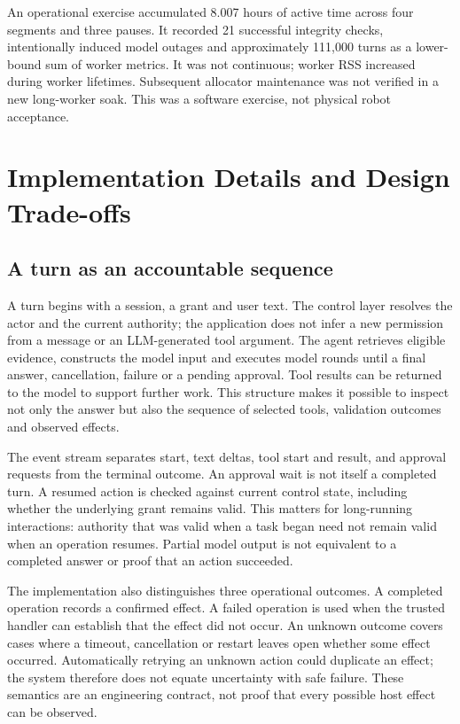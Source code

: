 \documentclass[11pt]{article}
\begin{document}
An operational exercise accumulated 8.007 hours of active time across four segments and three pauses. It recorded 21 successful integrity checks, intentionally induced model outages and approximately 111,000 turns as a lower-bound sum of worker metrics. It was not continuous; worker RSS increased during worker lifetimes. Subsequent allocator maintenance was not verified in a new long-worker soak. This was a software exercise, not physical robot acceptance.


\section{Implementation Details and Design Trade-offs}
\subsection{A turn as an accountable sequence}
A turn begins with a session, a grant and user text. The control layer resolves the actor and the current authority; the application does not infer a new permission from a message or an LLM-generated tool argument. The agent retrieves eligible evidence, constructs the model input and executes model rounds until a final answer, cancellation, failure or a pending approval. Tool results can be returned to the model to support further work. This structure makes it possible to inspect not only the answer but also the sequence of selected tools, validation outcomes and observed effects.

The event stream separates start, text deltas, tool start and result, and approval requests from the terminal outcome. An approval wait is not itself a completed turn. A resumed action is checked against current control state, including whether the underlying grant remains valid. This matters for long-running interactions: authority that was valid when a task began need not remain valid when an operation resumes. Partial model output is not equivalent to a completed answer or proof that an action succeeded.

The implementation also distinguishes three operational outcomes. A completed operation records a confirmed effect. A failed operation is used when the trusted handler can establish that the effect did not occur. An unknown outcome covers cases where a timeout, cancellation or restart leaves open whether some effect occurred. Automatically retrying an unknown action could duplicate an effect; the system therefore does not equate uncertainty with safe failure. These semantics are an engineering contract, not proof that every possible host effect can be observed.
\end{document}
